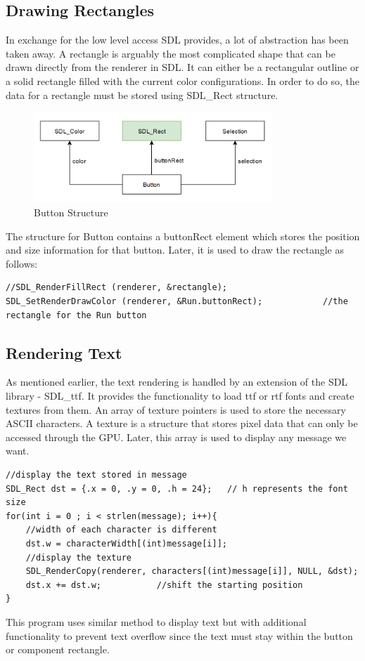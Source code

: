 \documentclass[report]{subfiles}
\begin{document}
    \subsection{Drawing Rectangles}
    In exchange for the low level access SDL provides, a lot of abstraction has been taken away. A rectangle is arguably the most complicated shape that can be drawn directly from the renderer in SDL. It can either be a rectangular outline or a solid rectangle filled with the current color configurations. In order to do so, the data for a rectangle must be stored using SDL\_Rect structure.
	\begin{figure}[H]
    \centering
    \includegraphics[width=0.8\textwidth]{graphics/button_structure.png}
    \caption{Button Structure}
	\end{figure}
The structure for Button contains a buttonRect element which stores the position and size information for that button. Later, it is used to draw the rectangle as follows:
\begin{lstlisting}
//SDL_RenderFillRect (renderer, &rectangle);
SDL_SetRenderDrawColor (renderer, &Run.buttonRect);            //the rectangle for the Run button
\end{lstlisting}
		
    	
    \subsection{Rendering Text}
    As mentioned earlier, the text rendering is handled by an extension of the SDL library - SDL\_ttf. It provides the functionality to load ttf or rtf fonts and create textures from them. An array of texture pointers is used to store the necessary ASCII characters. A texture is a structure that stores pixel data that can only be accessed through the GPU. Later, this array is used to display any message we want.
\begin{lstlisting}
//display the text stored in message
SDL_Rect dst = {.x = 0, .y = 0, .h = 24};   // h represents the font size
for(int i = 0 ; i < strlen(message); i++){
	//width of each character is different
	dst.w = characterWidth[(int)message[i]]; 
	//display the texture 
	SDL_RenderCopy(renderer, characters[(int)message[i]], NULL, &dst); 
	dst.x += dst.w;           //shift the starting position 
}
\end{lstlisting}
This program uses similar method to display text but with additional functionality to prevent text overflow since the text must stay within the button or component rectangle.
\end{document}
